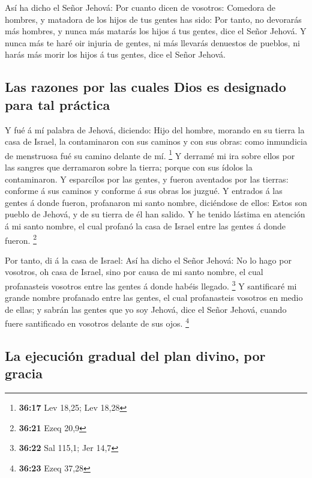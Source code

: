  Así ha dicho el Señor Jehová: Por cuanto dicen de
vosotros: Comedora de hombres, y matadora de los hijos de tus gentes has
sido:  Por tanto, no devorarás más hombres, y nunca más
matarás los hijos á tus gentes, dice el Señor Jehová.  Y
nunca más te haré oir injuria de gentes, ni más llevarás denuestos de
pueblos, ni harás más morir los hijos á tus gentes, dice el Señor
Jehová.

\hypertarget{las-razones-por-las-cuales-dios-es-designado-para-tal-pruxe1ctica}{%
\subsection{Las razones por las cuales Dios es designado para tal
práctica}\label{las-razones-por-las-cuales-dios-es-designado-para-tal-pruxe1ctica}}

 Y fué á mí palabra de Jehová, diciendo:  Hijo
del hombre, morando en su tierra la casa de Israel, la contaminaron con
sus caminos y con sus obras: como inmundicia de menstruosa fué su camino
delante de mí. \footnote{\textbf{36:17} Lev 18,25; Lev 18,28}
 Y derramé mi ira sobre ellos por las sangres que
derramaron sobre la tierra; porque con sus ídolos la contaminaron.
 Y esparcílos por las gentes, y fueron aventados por las
tierras: conforme á sus caminos y conforme á sus obras los juzgué.
 Y entrados á las gentes á donde fueron, profanaron mi
santo nombre, diciéndose de ellos: Estos son pueblo de Jehová, y de su
tierra de él han salido.  Y he tenido lástima en atención á
mi santo nombre, el cual profanó la casa de Israel entre las gentes á
donde fueron. \footnote{\textbf{36:21} Ezeq 20,9}

 Por tanto, di á la casa de Israel: Así ha dicho el Señor
Jehová: No lo hago por vosotros, oh casa de Israel, sino por causa de mi
santo nombre, el cual profanasteis vosotros entre las gentes á donde
habéis llegado. \footnote{\textbf{36:22} Sal 115,1; Jer 14,7}
 Y santificaré mi grande nombre profanado entre las gentes,
el cual profanasteis vosotros en medio de ellas; y sabrán las gentes que
yo soy Jehová, dice el Señor Jehová, cuando fuere santificado en
vosotros delante de sus ojos. \footnote{\textbf{36:23} Ezeq 37,28}

\hypertarget{la-ejecuciuxf3n-gradual-del-plan-divino-por-gracia}{%
\subsection{La ejecución gradual del plan divino, por
gracia}\label{la-ejecuciuxf3n-gradual-del-plan-divino-por-gracia}}

